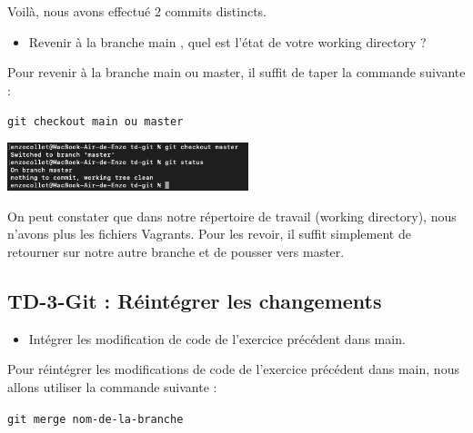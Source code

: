 \documentclass[12pt]{article}
\begin{document}
Voilà, nous avons effectué 2 commits distincts.

\vspace{0.3cm}

\begin{itemize}
  \item Revenir à la branche main , quel est l'état de votre working directory ?
\end{itemize}

\vspace{0.3cm}

Pour revenir à la branche main ou master, il suffit de taper la commande suivante :

\texttt{git checkout main ou master}

\vspace{0.3cm}

\begin{center}
  \includegraphics[width=7cm]{Image-TD-Git-2/git-checkout-master.png}
\end{center}

\vspace{0.3cm}

On peut constater que dans notre répertoire de travail (working directory), nous n'avons plus les fichiers Vagrants. Pour les revoir, il suffit simplement de retourner sur notre autre branche et de pousser vers master.


\newpage

\subsection{TD-3-Git : Réintégrer les changements}

\vspace{0.3cm}

\begin{itemize}
  \item Intégrer les modification de code de l'exercice précédent dans main.
\end{itemize}

\vspace{0.3cm}

Pour réintégrer les modifications de code de l'exercice précédent dans main, nous allons utiliser la commande suivante :

\texttt{git merge nom-de-la-branche}
\end{document}
